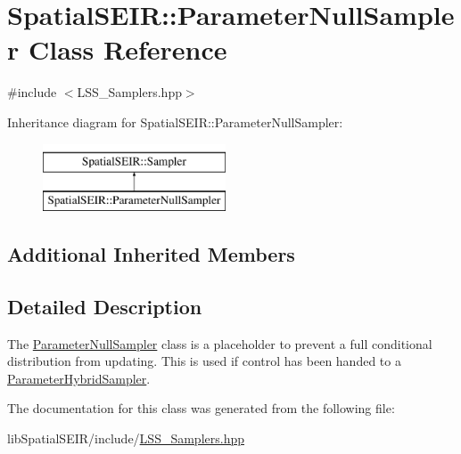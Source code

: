 \hypertarget{classSpatialSEIR_1_1ParameterNullSampler}{\section{Spatial\-S\-E\-I\-R\-:\-:Parameter\-Null\-Sampler Class Reference}
\label{classSpatialSEIR_1_1ParameterNullSampler}
}


{\ttfamily \#include $<$L\-S\-S\-\_\-\-Samplers.\-hpp$>$}

Inheritance diagram for Spatial\-S\-E\-I\-R\-:\-:Parameter\-Null\-Sampler\-:\begin{figure}[H]
\begin{center}
\leavevmode
\includegraphics[height=2.000000cm]{classSpatialSEIR_1_1ParameterNullSampler}
\end{center}
\end{figure}
\subsection*{Additional Inherited Members}


\subsection{Detailed Description}
The \hyperlink{classSpatialSEIR_1_1ParameterNullSampler}{Parameter\-Null\-Sampler} class is a placeholder to prevent a full conditional distribution from updating. This is used if control has been handed to a \hyperlink{classSpatialSEIR_1_1ParameterHybridSampler}{Parameter\-Hybrid\-Sampler}. 

The documentation for this class was generated from the following file\-:\begin{DoxyCompactItemize}
\item 
lib\-Spatial\-S\-E\-I\-R/include/\hyperlink{LSS__Samplers_8hpp}{L\-S\-S\-\_\-\-Samplers.\-hpp}\end{DoxyCompactItemize}
